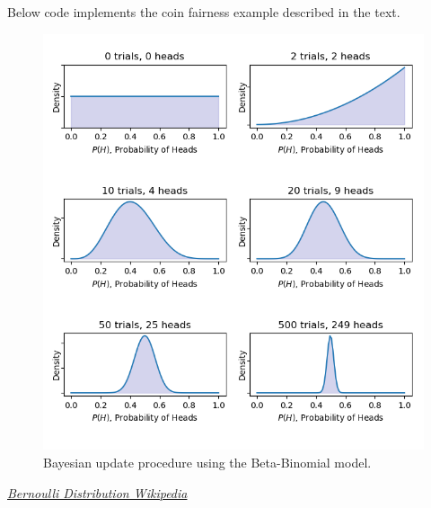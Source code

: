 \begin{finmarkets}
Below code implements the coin fairness example described in the text.
\end{finmarkets}


\begin{figure}[htb]
  \centering
  \includegraphics[width=.7\textwidth]{figures/bayes}
  \caption{Bayesian update procedure using the Beta-Binomial model.}
  \label{fig:bayes}
\end{figure}

%

\begin{thebibliography}{9}
\href{https://en.wikipedia.org/wiki/Bernoulli_distribution}{\emph{Bernoulli Distribution Wikipedia}}
\end{thebibliography}










